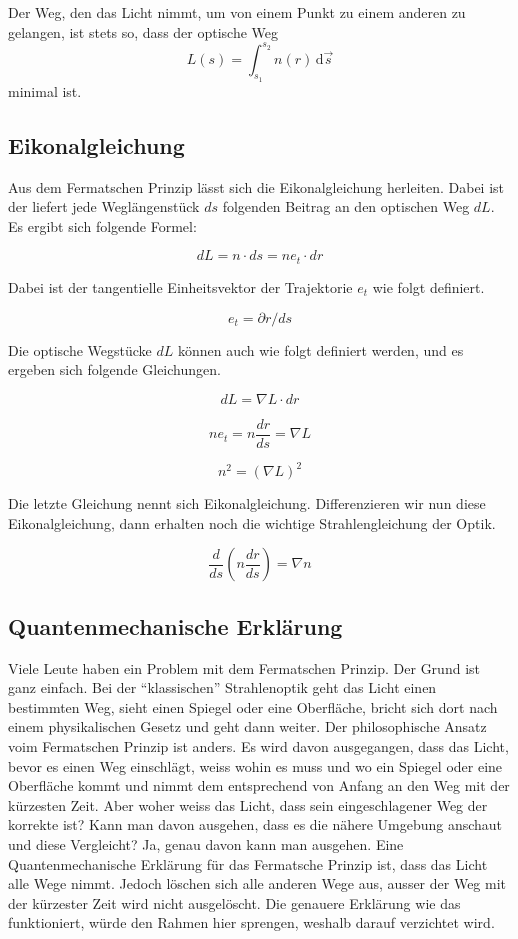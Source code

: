 Der Weg, den das Licht nimmt, 
um von einem Punkt zu einem anderen zu gelangen, 
ist stets so, dass der optische Weg 
\[
L(s) = \int_{s_1}^{s_2} n(r) \,\mathrm d\vec s
\]
minimal ist.

\subsection{Eikonalgleichung}

Aus dem Fermatschen Prinzip lässt sich die Eikonalgleichung herleiten.
Dabei ist der liefert jede Weglängenstück $ds$ folgenden Beitrag an den optischen Weg $dL$. 
Es ergibt sich folgende Formel:

\[
dL = n \cdot ds = n e_t \cdot dr
\]

Dabei ist der tangentielle Einheitsvektor der Trajektorie $e_t$ wie folgt definiert.

\[
e_t = \partial r / ds
\]

Die optische Wegstücke $dL$ können auch wie folgt definiert werden, 
und es ergeben sich folgende Gleichungen.

\[
dL = \nabla L \cdot dr
\]

\[
n e_t = n \frac{dr}{ds} = \nabla L
\]

\[
n^2 = (\nabla L)^2
\]

Die letzte Gleichung nennt sich Eikonalgleichung.
Differenzieren wir nun diese Eikonalgleichung, 
dann erhalten noch die wichtige Strahlengleichung der Optik.

\[
\frac{d}{ds} \left ( n \frac{dr}{ds} \right ) = \nabla n
\]

\subsection{Quantenmechanische Erklärung}
Viele Leute haben ein Problem mit dem Fermatschen Prinzip. 
Der Grund ist ganz einfach. 
Bei der ``klassischen'' Strahlenoptik geht das Licht einen bestimmten Weg, 
sieht einen Spiegel oder eine Oberfläche, bricht sich dort nach einem 
physikalischen Gesetz und geht dann weiter.
Der philosophische Ansatz voim Fermatschen Prinzip ist anders. 
Es wird davon ausgegangen, 
dass das Licht, bevor es einen Weg einschlägt, 
weiss wohin es muss und wo ein Spiegel oder eine Oberfläche kommt und 
nimmt dem entsprechend von Anfang an den Weg mit der kürzesten Zeit.
Aber woher weiss das Licht, dass sein eingeschlagener Weg der korrekte ist?
Kann man davon ausgehen, dass es die nähere Umgebung anschaut und diese Vergleicht?
Ja, genau davon kann man ausgehen. 
Eine Quantenmechanische Erklärung für das Fermatsche Prinzip ist, 
dass das Licht alle Wege nimmt. Jedoch löschen sich alle anderen Wege aus, 
ausser der Weg mit der kürzester Zeit wird nicht ausgelöscht.
Die genauere Erklärung wie das funktioniert, würde den Rahmen hier sprengen, 
weshalb darauf verzichtet wird.